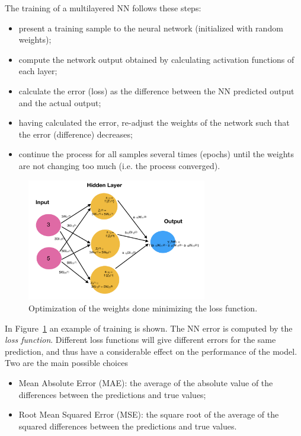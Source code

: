 The training of a multilayered NN follows these steps:

\begin{itemize}
	\tightlist
	\item
	present a training sample to the neural network (initialized with
	random weights);
	\item
	compute the network output obtained by calculating activation functions of each layer;
	\item
	calculate the error (loss) as the difference between the NN predicted
	output and the actual output;
	\item
	having calculated the error, re-adjust the weights of the network such
	that the error (difference) decreases;
	\item
	continue the process for all samples several times (epochs) until the
	weights are not changing too much (i.e. the process converged).
\end{itemize}

\begin{figure}[htb]
	\centering
	\includegraphics[width=0.7\textwidth]{figures/training_nn}
	\caption{Optimization of the weights done minimizing the loss function.}
        \label{fig:training}
\end{figure}

In Figure~\ref{fig:training} an example of training is shown.
The NN error is computed by the \emph{loss function}. Different loss
functions will give different errors for the same prediction, and thus
have a considerable effect on the performance of the model. Two are the
main possible choices

\begin{itemize}
	\tightlist
	\item
	Mean Absolute Error (MAE): the average of the absolute value of the
	differences between the predictions and true values;
	\item
	Root Mean Squared Error (MSE): the square root of the average of the
	squared differences between the predictions and true values.
\end{itemize}

